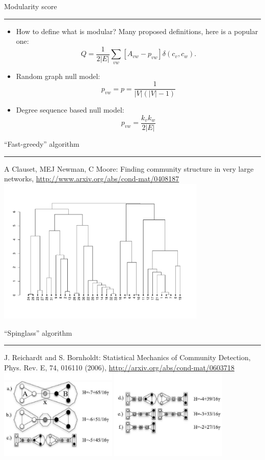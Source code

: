 \documentclass[landscape,fleqno]{foils}
\newcommand{\stitle}[1]{{\color{blue}\Large #1\par\vspace*{10pt}\hrule}}
\newenvironment{narrow}[2]{%
  \begin{list}{}{%
      \setlength{\topsep}{0pt}%
      \setlength{\leftmargin}{#1}%
      \setlength{\rightmargin}{#2}%
      \setlength{\listparindent}{\parindent}%
      \setlength{\itemindent}{\parindent}%
      \setlength{\parsep}{\parskip}}%
    \item[]}{\end{list}}
\begin{document}
\newpage
\stitle{Modularity score}
\begin{narrow}{0cm}{15cm}
\begin{itemize}
\item How to define what is modular? Many proposed definitions, here
  is a popular one:
  \[ Q = \frac1{2|E|}\sum_{vw} [A_{vw} - p_{vw} ]\delta(c_v,c_w). \] \pause
\item Random graph null model: 
  \[ p_{vw} = p = \frac{1}{|V|(|V|-1)} \] \pause
\item Degree sequence based null model:
  \[ p_{vw} = \frac{k_vk_w}{2|E|} \]
\end{itemize}
\end{narrow}

\newpage
\stitle{``Fast-greedy'' algorithm}
\begin{center}
A Clauset, MEJ Newman, C Moore: Finding community structure in very
large networks, \url{http://www.arxiv.org/abs/cond-mat/0408187}\\
\includegraphics[width=0.75\textwidth]{dend}
\end{center}

\newpage
\stitle{``Spinglass'' algorithm}
\begin{center}
J. Reichardt and S. Bornholdt: Statistical Mechanics of Community
Detection, Phys. Rev. E, 74, 016110 (2006),
\url{http://arxiv.org/abs/cond-mat/0603718}
\includegraphics[width=0.42\textwidth]{spinglass1}\hfil%
\includegraphics[width=0.42\textwidth]{spinglass2}
\end{center}
\end{document}
